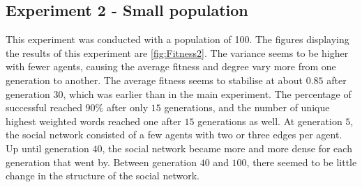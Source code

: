 \begin{figure}[htbp]
    \hfill
    \label{fig:SN}
\end{figure}


\subsection{Experiment 2 - Small population}
This experiment was conducted with a population of 100. The figures displaying the results of this experiment are \ref{fig:Fitness2}. The variance seems to be higher with fewer agents, causing the average fitness and degree vary more from one generation to another. The average fitness seems to stabilise at about $0.85$ after generation $30$, which was earlier than in the main experiment. The percentage of successful reached $90\%$ after only $15$ generations, and the number of unique highest weighted words reached one after $15$ generations as well. At generation $5$, the social network consisted of a few agents with two or three edges per agent. Up until generation $40$, the social network became more and more dense for each generation that went by. Between generation $40$ and $100$, there seemed to be little change in the structure of the social network.   
